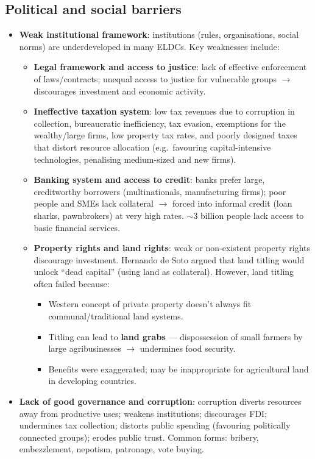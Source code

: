 \subsection{Political and social barriers}
\begin{itemize}
  \item \textbf{Weak institutional framework}: institutions (rules, organisations, social norms) are underdeveloped in many ELDCs. Key weaknesses include:
  \begin{itemize}
    \item \textbf{Legal framework and access to justice}: lack of effective enforcement of laws/contracts; unequal access to justice for vulnerable groups $\to$ discourages investment and economic activity.
    \item \textbf{Ineffective taxation system}: low tax revenues due to corruption in collection, bureaucratic inefficiency, tax evasion, exemptions for the wealthy/large firms, low property tax rates, and poorly designed taxes that distort resource allocation (e.g.\ favouring capital-intensive technologies, penalising medium-sized and new firms).
    \item \textbf{Banking system and access to credit}: banks prefer large, creditworthy borrowers (multinationals, manufacturing firms); poor people and SMEs lack collateral $\to$ forced into informal credit (loan sharks, pawnbrokers) at very high rates. $\sim$3 billion people lack access to basic financial services.
    \item \textbf{Property rights and land rights}: weak or non-existent property rights discourage investment. Hernando de Soto argued that land titling would unlock ``dead capital'' (using land as collateral). However, land titling often failed because:
    \begin{itemize}
      \item Western concept of private property doesn't always fit communal/traditional land systems.
      \item Titling can lead to \textbf{land grabs} --- dispossession of small farmers by large agribusinesses $\to$ undermines food security.
      \item Benefits were exaggerated; may be inappropriate for agricultural land in developing countries.
    \end{itemize}
  \end{itemize}
  \item \textbf{Lack of good governance and corruption}: corruption diverts resources away from productive uses; weakens institutions; discourages FDI; undermines tax collection; distorts public spending (favouring politically connected groups); erodes public trust. Common forms: bribery, embezzlement, nepotism, patronage, vote buying.

\end{itemize}
